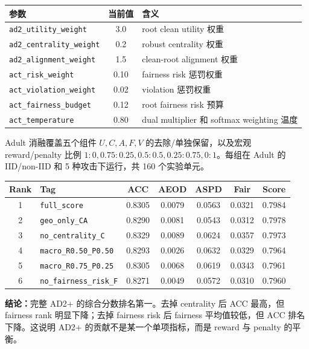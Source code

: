 \documentclass[10.5pt]{article}
\newcommand{\sectiontitle}[1]{\vspace{0.55em}{\Large\bfseries\color{headblue}#1}\par\vspace{0.15em}}
\begin{document}
\begin{tabularx}{\linewidth}{@{}Y C Y@{}}
\toprule
参数 & 当前值 & 含义 \\
\midrule
\texttt{ad2\_utility\_weight} & 3.0 & root clean utility 权重 \\
\texttt{ad2\_centrality\_weight} & 0.2 & robust centrality 权重 \\
\texttt{ad2\_alignment\_weight} & 1.5 & clean-root alignment 权重 \\
\texttt{act\_risk\_weight} & 0.10 & fairness risk 惩罚权重 \\
\texttt{act\_violation\_weight} & 0.02 & violation 惩罚权重 \\
\texttt{act\_fairness\_budget} & 0.12 & root fairness risk 预算 \\
\texttt{act\_temperature} & 0.80 & dual multiplier 和 softmax weighting 温度 \\
\bottomrule
\end{tabularx}

\sectiontitle{3. Adult AD2+ 消融实验}

Adult 消融覆盖五个组件 $U,C,A,F,V$ 的去除/单独保留，以及宏观 reward/penalty 比例 $1:0, 0.75:0.25, 0.5:0.5, 0.25:0.75, 0:1$。每组在 Adult 的 IID/non-IID 和 5 种攻击下运行，共 160 个实验单元。

\begin{tabularx}{\linewidth}{@{}c Y c c c c c@{}}
\toprule
Rank & Tag & ACC & AEOD & ASPD & Fair & Score \\
 & \texttt{full\_score} & 0.8305 & 0.0079 & 0.0563 & 0.0321 & 0.7984 \\
2 & \texttt{geo\_only\_CA} & 0.8290 & 0.0081 & 0.0543 & 0.0312 & 0.7978 \\
3 & \texttt{no\_centrality\_C} & 0.8329 & 0.0089 & 0.0624 & 0.0357 & 0.7973 \\
4 & \texttt{macro\_R0.50\_P0.50} & 0.8293 & 0.0026 & 0.0632 & 0.0329 & 0.7964 \\
5 & \texttt{macro\_R0.75\_P0.25} & 0.8305 & 0.0068 & 0.0619 & 0.0343 & 0.7961 \\
6 & \texttt{no\_fairness\_risk\_F} & 0.8271 & 0.0049 & 0.0572 & 0.0310 & 0.7960 \\
\bottomrule
\end{tabularx}

\textbf{结论：}完整 AD2+ 的综合分数排名第一。去掉 centrality 后 ACC 最高，但 fairness rank 明显下降；去掉 fairness risk 后 fairness 平均值较低，但 ACC 排名下降。这说明 AD2+ 的贡献不是某一个单项指标，而是 reward 与 penalty 的平衡。
\end{document}
